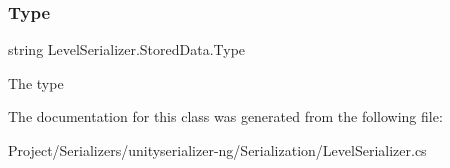 \subsubsection{\texorpdfstring{Type}{Type}}
{\footnotesize\ttfamily string Level\+Serializer.\+Stored\+Data.\+Type}



The type 



The documentation for this class was generated from the following file\+:\begin{DoxyCompactItemize}
\item 
Project/\+Serializers/unityserializer-\/ng/\+Serialization/Level\+Serializer.\+cs\end{DoxyCompactItemize}

